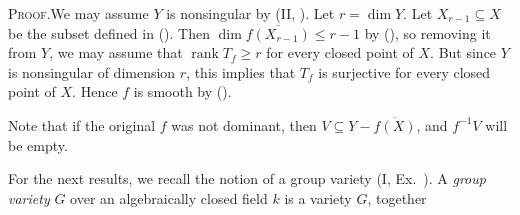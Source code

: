 {\par\smallskip\noindent\textsc{Proof.}\enspace We may assume $Y$ is nonsingular by (II, ). Let $r=\dim Y$. Let $X_{r-1}\subseteq X$ be the subset defined in (). Then $\dim\overline{f(X_{r-1})}\leqslant r-1$ by (), so removing it from $Y$, we may assume that $\operatorname{rank}T_f\geqslant r$ for every closed point of $X$. But since $Y$ is nonsingular of dimension $r$, this implies that $T_f$ is surjective for every closed point of $X$. Hence $f$ is smooth by ().

Note that if the original $f$ was not dominant, then $V\subseteq Y-\overline{f(X)}$, and $f^{-1}V$ will be empty.

\medskip
For the next results, we recall the notion of a group variety (I, Ex.~). A \emph{group variety} $G$ over an algebraically closed field $k$ is a variety $G$, together
}
